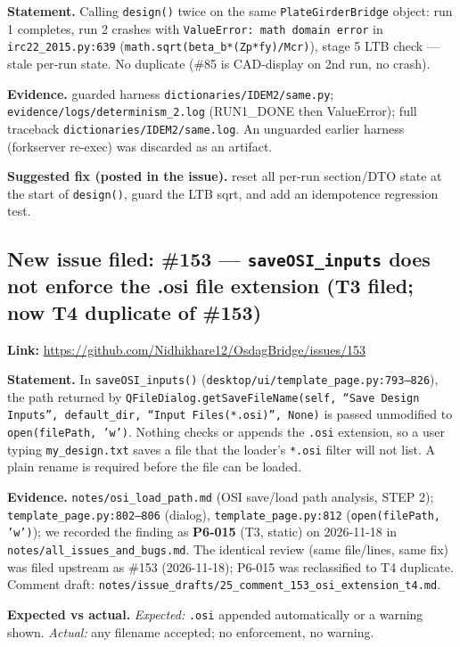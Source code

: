 \documentclass[11pt,a4paper]{article}
\begin{document}
\textbf{Statement.} Calling \texttt{design()} twice on the same \texttt{PlateGirderBridge} object: run 1 completes, run 2 crashes with \texttt{ValueError: math domain error} in \texttt{irc22\_2015.py:639} (\texttt{math.sqrt(beta\_b*(Zp*fy)/Mcr)}), stage 5 LTB check — stale per-run state. No duplicate (\#85 is CAD-display on 2nd run, no crash).

\textbf{Evidence.} guarded harness \texttt{dictionaries/IDEM2/same.py}; \texttt{evidence/logs/determinism\_2.log} (RUN1\_DONE then ValueError); full traceback \texttt{dictionaries/IDEM2/same.log}. An unguarded earlier harness (forkserver re-exec) was discarded as an artifact.

\textbf{Suggested fix (posted in the issue).} reset all per-run section/DTO state at the start of \texttt{design()}, guard the LTB sqrt, and add an idempotence regression test.

\subsection{New issue filed: \#153 --- \texttt{saveOSI\_inputs} does not enforce the .osi file extension (T3 filed; now T4 duplicate of \#153)}
\textbf{Link:} \url{https://github.com/Nidhikhare12/OsdagBridge/issues/153}

\textbf{Statement.} In \texttt{saveOSI\_inputs()} (\texttt{desktop/ui/template\_page.py:793--826}), the path returned by \texttt{QFileDialog.getSaveFileName(self, ``Save Design Inputs'', default\_dir, ``Input Files(*.osi)'', None)} is passed unmodified to \texttt{open(filePath, 'w')}. Nothing checks or appends the \texttt{.osi} extension, so a user typing \texttt{my\_design.txt} saves a file that the loader's \texttt{*.osi} filter will not list. A plain rename is required before the file can be loaded.

\textbf{Evidence.} \texttt{notes/osi\_load\_path.md} (OSI save/load path analysis, STEP 2); \texttt{template\_page.py:802--806} (dialog), \texttt{template\_page.py:812} (\texttt{open(filePath, 'w')}); we recorded the finding as \textbf{P6-015} (T3, static) on 2026-11-18 in \texttt{notes/all\_issues\_and\_bugs.md}. The identical review (same file/lines, same fix) was filed upstream as \#153 (2026-11-18); P6-015 was reclassified to T4 duplicate. Comment draft: \texttt{notes/issue\_drafts/25\_comment\_153\_osi\_extension\_t4.md}.

\textbf{Expected vs actual.} \emph{Expected:} \texttt{.osi} appended automatically or a warning shown. \emph{Actual:} any filename accepted; no enforcement, no warning.
\end{document}
